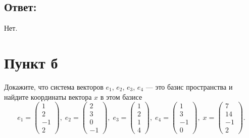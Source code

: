 \documentclass[12pt]{article}
\begin{document}
    \subsection*{Ответ:}
    Нет.

    \section*{Пункт б}
    Докажите, что система векторов $e_1$, $e_2$, $e_3$, $e_4$ --- это базис пространства и найдите координаты вектора $x$ в этом базисе
    \[
        e_1 =
        \begin{pmatrix}
            1 \\ 2 \\ -1 \\ 2
        \end{pmatrix}, \;
        e_2 =
        \begin{pmatrix}
            2 \\ 3 \\ 0 \\ -1
        \end{pmatrix}, \;
        e_3 =
        \begin{pmatrix}
            1 \\ 2 \\ 1 \\ 4
        \end{pmatrix}, \;
        e_4 =
        \begin{pmatrix}
            1 \\ 3 \\ -1 \\ 0
        \end{pmatrix}, \;
        x =
        \begin{pmatrix}
            7 \\ 14 \\ -1 \\ 2
        \end{pmatrix} .
    \]
\end{document}
